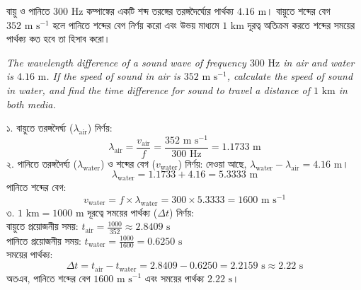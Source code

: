 \documentclass[12pt, a4paper]{article}
\begin{document}
\vspace{1.5em}

\begin{tcolorbox}[questionbox={প্রশ্ন (Question) 8}]
\noindent
বায়ু ও পানিতে $300\text{ Hz}$ কম্পাঙ্কের একটি শব্দ তরঙ্গের তরঙ্গদৈর্ঘ্যের পার্থক্য $4.16\text{ m}$। বায়ুতে শব্দের বেগ $352\text{ m s}^{-1}$ হলে পানিতে শব্দের বেগ নির্ণয় করো এবং উভয় মাধ্যমে $1\text{ km}$ দূরত্ব অতিক্রম করতে শব্দের সময়ের পার্থক্য কত হবে তা হিসাব করো।

\vspace{0.8em}
\begin{english}
\noindent\textit{\color{darkgray}
The wavelength difference of a sound wave of frequency $300\text{ Hz}$ in air and water is $4.16\text{ m}$. If the speed of sound in air is $352\text{ m s}^{-1}$, calculate the speed of sound in water, and find the time difference for sound to travel a distance of $1\text{ km}$ in both media.
}
\end{english}
\end{tcolorbox}

\vspace{1em}

\begin{tcolorbox}[solutionbox={সমাধান (Solution)}]
\noindent
১. বায়ুতে তরঙ্গদৈর্ঘ্য ($\lambda_{\text{air}}$) নির্ণয়:
\[ \lambda_{\text{air}} = \frac{v_{\text{air}}}{f} = \frac{352\text{ m s}^{-1}}{300\text{ Hz}} = 1.1733\text{ m} \]
২. পানিতে তরঙ্গদৈর্ঘ্য ($\lambda_{\text{water}}$) ও শব্দের বেগ ($v_{\text{water}}$) নির্ণয়: দেওয়া আছে, $\lambda_{\text{water}} - \lambda_{\text{air}} = 4.16\text{ m}$।
\[ \lambda_{\text{water}} = 1.1733 + 4.16 = 5.3333\text{ m} \]
পানিতে শব্দের বেগ:
\[ v_{\text{water}} = f \times \lambda_{\text{water}} = 300 \times 5.3333 = 1600\text{ m s}^{-1} \]
৩. $1\text{ km} = 1000\text{ m}$ দূরত্বে সময়ের পার্থক্য ($\Delta t$) নির্ণয়: \\
বায়ুতে প্রয়োজনীয় সময়: $t_{\text{air}} = \frac{1000}{352} \approx 2.8409\text{ s}$ \\
পানিতে প্রয়োজনীয় সময়: $t_{\text{water}} = \frac{1000}{1600} = 0.6250\text{ s}$ \\
সময়ের পার্থক্য:
\[ \Delta t = t_{\text{air}} - t_{\text{water}} = 2.8409 - 0.6250 = 2.2159\text{ s} \approx 2.22\text{ s} \]
অতএব, পানিতে শব্দের বেগ $1600\text{ m s}^{-1}$ এবং সময়ের পার্থক্য $2.22\text{ s}$।
\end{tcolorbox}
\end{document}
